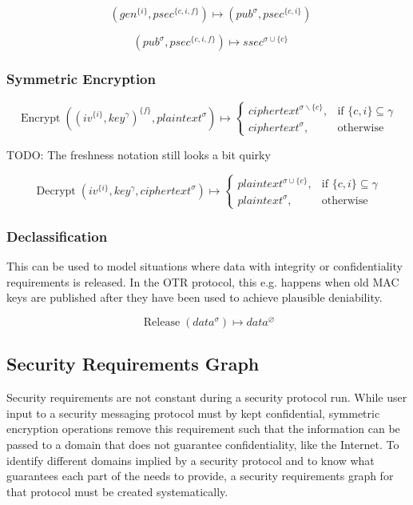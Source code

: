 \documentclass[a4paper]{article}
\DeclareMathOperator{\enc}{Encrypt}
\DeclareMathOperator{\dec}{Decrypt}
\DeclareMathOperator{\dhsec}{DH_{Sec}}
\DeclareMathOperator{\dhpub}{DH_{Pub}}
\DeclareMathOperator{\release}{Release}
\newcommand{\TODO}[1]{\small\noindent\color{red} TODO: #1\color{black}}
\newcommand{\emptysec}{\varnothing}
\newcommand{\secminus}{\smallsetminus}
\begin{document}
$$\dhpub(gen^{\{i\}}, psec^{\{c,i,f\}}) \mapsto (pub^\sigma, psec^{\{c,i\}})$$

$$\dhsec(pub^\sigma, psec^{\{c,i,f\}}) \mapsto ssec^{\sigma\cup\{c\}} $$

\subsubsection{Symmetric Encryption}

\begin{equation*}
    \enc((iv^{\{i\}}, key^\gamma)^{\{f\}}, plaintext^\sigma) \mapsto
    \begin{cases}
        ciphertext^{\sigma\secminus\{c\}}, & \text{if $\{c,i\} \subseteq \gamma$} \\
        ciphertext^{\sigma},               & \text{otherwise}
    \end{cases}
\end{equation*}

\TODO{The freshness notation still looks a bit quirky}

\begin{equation*}
    \dec(iv^{\{i\}}, key^\gamma, ciphertext^\sigma) \mapsto
    \begin{cases}
        plaintext^{\sigma\cup\{c\}}, & \text{if $\{c,i\} \subseteq \gamma$} \\
        plaintext^{\sigma},          & \text{otherwise}
    \end{cases}
\end{equation*}

\subsubsection{Declassification}

This can be used to model situations where data with integrity or
confidentiality requirements is released. In the OTR protocol, this e.g.
happens when old MAC keys are published after they have been used to achieve
plausible deniability.

$$\release(data^\sigma) \mapsto data^\emptysec $$

\subsection{Security Requirements Graph}

Security requirements are not constant during a security protocol run. While
user input to a security messaging protocol must by kept confidential,
symmetric encryption operations remove this requirement such that the
information can be passed to a domain that does not guarantee confidentiality,
like the Internet. To identify different domains implied by a security protocol
and to know what guarantees each part of the needs to provide, a security
requirements graph for that protocol must be created systematically.
\end{document}
